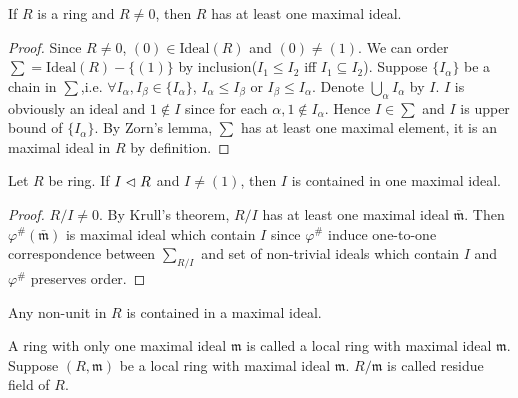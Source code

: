 \documentclass{amsart}
\begin{document}
\begin{secthm}
	If $R$ is a ring and $R \neq 0$, then $R$ has at least one maximal ideal.
\end{secthm}
\begin{proof}
	Since $R \neq 0$, $(0) \in \text{Ideal}(R)$ and $(0) \neq (1)$. We can order $\sum = \text{Ideal}(R)-\{ (1)\}$ by inclusion($I_1 \leq I_2$ iff $I_1 \subseteq I_2$). Suppose $\{ I_\alpha\}$  be a chain in $\sum$,i.e. $\forall I_\alpha , I_\beta \in \{ I_\alpha\}$, $I_ \alpha \leq I_\beta$ or $I_\beta \leq I_\alpha$. Denote $\bigcup_\alpha I_\alpha$ by $I$. $I$ is obviously an ideal and $1 \notin I$ since for each $\alpha, 1 \notin I_\alpha$. Hence $I \in \sum$ and $I$ is upper bound of $\{ I_\alpha \}$. By Zorn's lemma, $\sum$ has at least one maximal element, it is an maximal ideal in $R$ by definition.
\end{proof}

\begin{seccor}
	Let $R$ be ring. If $I \vartriangleleft R$ and $I \neq (1)$, then $I$ is contained in one maximal ideal.
\end{seccor}
\begin{proof}
	$R/I \neq 0$. By Krull's theorem, $R/I$ has at least one maximal ideal $\bar{\mathfrak{m}}$. Then $\varphi^{\#}(\bar{\mathfrak{m}})$ is maximal ideal which contain $I$ since $\varphi^{\#}$ induce one-to-one correspondence between $\sum_{R/I}$ and set of non-trivial ideals which contain $I$ and $\varphi^{\#}$ preserves order.
\end{proof}

\begin{seccor}
	Any non-unit in $R$ is contained in a maximal ideal.
\end{seccor}

\begin{secdefn}
	A ring with only one maximal ideal $\mathfrak{m}$ is called a local ring with maximal ideal $\mathfrak{m}$. Suppose $(R, \mathfrak{m})$ be a local ring with maximal ideal $\mathfrak{m}$. $R/\mathfrak{m}$ is called residue field of $R$.
\end{secdefn}
\end{document}
